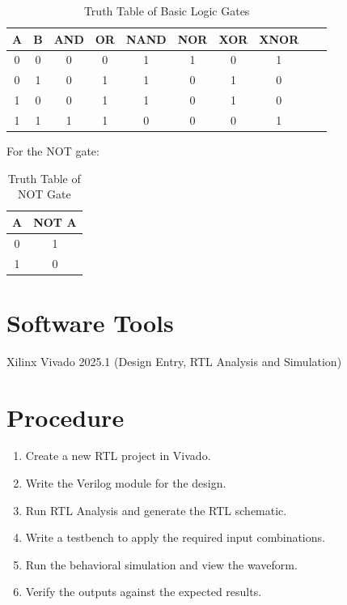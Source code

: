 \documentclass[12pt,a4paper]{report}
\begin{document}
\begin{table}[H]
    \centering
    \caption{Truth Table of Basic Logic Gates}
    \label{tab:basic_gates}
    \begin{tabular}{|c|c|c|c|c|c|c|c|c|c|}
    \hline
    \textbf{A} & \textbf{B} & \textbf{AND} & \textbf{OR} &
    \textbf{NAND} & \textbf{NOR} & \textbf{XOR} & \textbf{XNOR} \\
    \hline
    0 & 0 & 0 & 0 & 1 & 1 & 0 & 1 \\
    \hline
    0 & 1 & 0 & 1 & 1 & 0 & 1 & 0 \\
    \hline
    1 & 0 & 0 & 1 & 1 & 0 & 1 & 0 \\
    \hline
    1 & 1 & 1 & 1 & 0 & 0 & 0 & 1 \\
    \hline
    \end{tabular}
\end{table}

For the NOT gate:

\begin{table}[H]
    \centering
    \caption{Truth Table of NOT Gate}
    \label{tab:not_gate}
    \begin{tabular}{|c|c|}
    \hline
    \textbf{A} & \textbf{NOT A} \\
    \hline
    0 & 1 \\
    \hline
    1 & 0 \\
    \hline
    \end{tabular}
\end{table}
\section{Software Tools}

Xilinx Vivado 2025.1 (Design Entry, RTL Analysis and Simulation)

\section{Procedure}

\begin{enumerate}
    \item Create a new RTL project in Vivado.
    \item Write the Verilog module for the design.
    \item Run RTL Analysis and generate the RTL schematic.
    \item Write a testbench to apply the required input combinations.
    \item Run the behavioral simulation and view the waveform.
    \item Verify the outputs against the expected results.
\end{enumerate}
\end{document}
